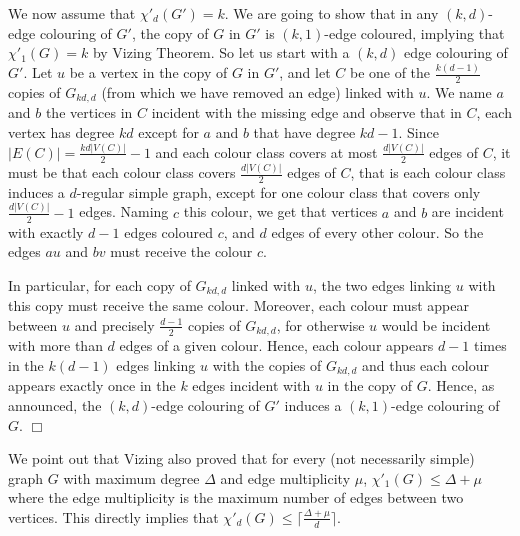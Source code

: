 \documentclass[11pt]{article}
\newcounter{claim}
\newenvironment{proof}[1][]%
 {\noindent {\setcounter{claim}{0}\sc proof ---
   }{#1}{}}{\hfill$\Box$\vspace{2ex}}
\begin{document}
\begin{proof}
We now assume that $\chi'_d(G') = k$. We are going to show that in any $(k,d)$-edge colouring of $G'$, the copy of $G$ in $G'$ is $(k,1)$-edge coloured, implying that $\chi'_1(G) = k$ by Vizing Theorem. So let us start with a $(k,d)$ edge colouring of $G'$. 
Let $u$ be a vertex in the copy of $G$ in $G'$, and let $C$ be one of the $\frac{k(d-1)}{2}$ copies of $G_{kd,d}$ (from which we have removed an edge) linked with $u$. 
We name $a$ and $b$ the vertices in $C$ incident with the missing edge and observe that in $C$, each vertex has degree $kd$ except for $a$ and $b$ that have degree $kd-1$.  
Since $|E(C)| = \frac{kd|V(C)|}{2} - 1$ and each colour class covers at most $\frac{d|V(C)|}{2}$ edges of $C$,  
it must be that each colour class covers $\frac{d|V(C)|}{2}$ edges of $C$, that is each colour class induces a $d$-regular simple graph, except for one colour class that covers only $\frac{d|V(C)|}{2} -1$ edges. %
Naming $c$ this colour, we get that vertices $a$ and $b$ are incident with exactly $d-1$ edges coloured $c$, and $d$ edges of every other colour. So the edges $au$ and $bv$ must receive the colour $c$. 

In particular, for each copy of $G_{kd,d}$ linked with $u$, the two edges linking $u$ with this copy must receive the same colour.  
Moreover, each colour must appear between $u$ and precisely $\frac{d-1}{2}$ copies of $G_{kd,d}$, for otherwise $u$ would be incident with more than $d$ edges of a given colour.
Hence, each colour appears $d-1$ times in the $k(d-1)$ edges linking $u$ with the copies of $G_{kd,d}$ and thus each colour appears exactly once in the $k$ edges incident with $u$ in the copy of $G$. 
Hence, as announced, the $(k,d)$-edge colouring of $G'$ induces a $(k,1)$-edge colouring of $G$. 
\end{proof}

We point out that Vizing\cite{V64} also proved that for every (not necessarily simple) graph $G$ with maximum degree $\Delta$ and edge multiplicity $\mu$, $\chi'_{1}(G) \leq \Delta + \mu$ where the edge multiplicity is the maximum number of edges between two vertices. This directly implies that $\chi'_{d}(G) \leq \lceil \frac{\Delta + \mu}{d} \rceil$.





\end{document}
